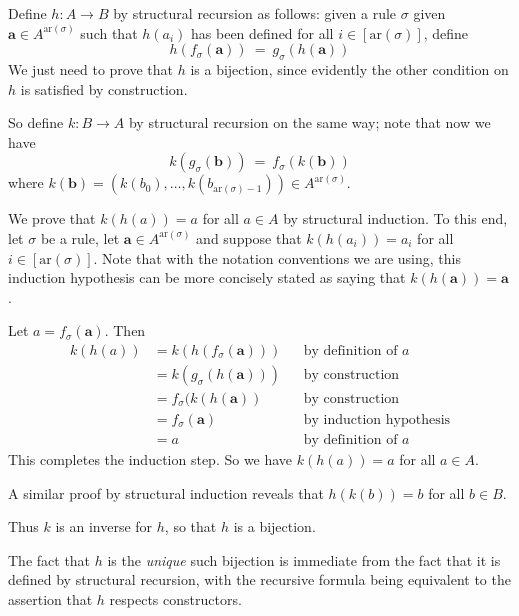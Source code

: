 \begin{cproof}
Define $h : A \to B$ by structural recursion as follows: given a rule $\sigma$ given $\mathbf{a} \in A^{\mathrm{ar}(\sigma)}$ such that $h(a_i)$ has been defined for all $i \in [\mathrm{ar}(\sigma)]$, define
\[ h(f_{\sigma}(\mathbf{a})) ~=~ g_{\sigma}(h(\mathbf{a})) \]
We just need to prove that $h$ is a bijection, since evidently the other condition on $h$ is satisfied by construction.

So define $k : B \to A$ by structural recursion on the same way; note that now we have
\[ k(g_{\sigma}(\mathbf{b})) ~=~ f_{\sigma}(k(\mathbf{b})) \]
where $k(\mathbf{b}) = (k(b_0),\dots,k(b_{\mathrm{ar}(\sigma)-1})) \in A^{\mathrm{ar}(\sigma)}$.

We prove that $k(h(a)) = a$ for all $a \in A$ by structural induction. To this end, let $\sigma$ be a rule, let $\mathbf{a} \in A^{\mathrm{ar}(\sigma)}$ and suppose that $k(h(a_i)) = a_i$ for all $i \in [\mathrm{ar}(\sigma)]$. Note that with the notation conventions we are using, this induction hypothesis can be more concisely stated as saying that $k(h(\mathbf{a})) = \mathbf{a}$.

Let $a = f_{\sigma}(\mathbf{a})$. Then
\begin{align*}
k(h(a))
&= k(h(f_{\sigma}(\mathbf{a}))) && \text{by definition of $a$} \\
&= k(g_{\sigma}(h(\mathbf{a}))) && \text{by construction} \\
&= f_{\sigma}(k(h(\mathbf{a})) && \text{by construction} \\
&= f_{\sigma}(\mathbf{a}) && \text{by induction hypothesis} \\
&= a && \text{by definition of $a$}
\end{align*}
This completes the induction step. So we have $k(h(a)) = a$ for all $a \in A$.

A similar proof by structural induction reveals that $h(k(b)) = b$ for all $b \in B$.

Thus $k$ is an inverse for $h$, so that $h$ is a bijection.

The fact that $h$ is the \textit{unique} such bijection is immediate from the fact that it is defined by structural recursion, with the recursive formula being equivalent to the assertion that $h$ respects constructors.
\end{cproof}

